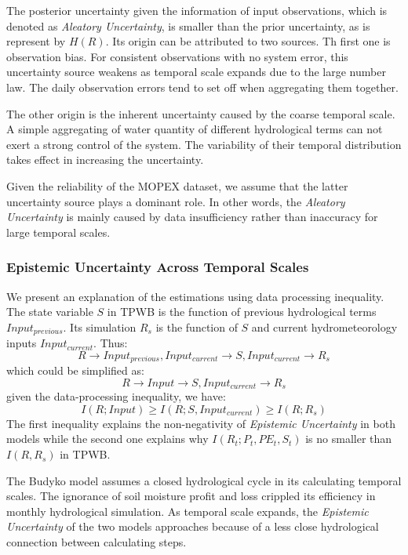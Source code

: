 \documentclass[draft,wrr]{AGUTeX}
\begin{document}
\begin{article}
The posterior uncertainty given the information of input observations, which is denoted as \emph{Aleatory Uncertainty}, is smaller than the prior uncertainty, as is represent by $H(R)$. Its origin can be attributed to two sources. Th first one is  observation bias. For consistent observations with no system error, this uncertainty source  weakens as temporal scale expands  due to the large number law. The daily observation errors tend to set off when aggregating them together. 

The other origin is the inherent uncertainty caused by the coarse temporal scale. A simple aggregating of water quantity of different hydrological terms can not exert a strong control of the system. The variability of their temporal distribution takes effect in increasing the uncertainty. 

Given the reliability of the MOPEX dataset, we assume that the latter uncertainty source plays a dominant role. In other words, the \emph{Aleatory Uncertainty} is mainly caused by data insufficiency rather than inaccuracy for large temporal scales. 
\subsubsection{Epistemic Uncertainty Across Temporal Scales}
We present an explanation of the estimations using data processing inequality. The state variable $S$ in TPWB is the function of previous hydrological terms $Input_{previous}$. Its simulation $R_s$ is the function of $S$ and current hydrometeorology inputs $Input_{current}$. Thus:
\begin{equation}
R \rightarrow Input_{previous},Input_{current} \rightarrow S,Input_{current} \rightarrow R_s
\end{equation}
which could be simplified  as:
 \begin{equation}
R \rightarrow Input \rightarrow S,Input_{current} \rightarrow R_s
\end{equation}
given the data-processing inequality, we have:
\begin{equation}
\label{ie2}
I(R;Input)\geq I(R;S,Input_{current}) \geq I(R;R_s)
\end{equation}
The first inequality explains the non-negativity of \emph{Epistemic Uncertainty} in both models while the second one explains why $I(R_t;P_t,PE_t,S_t)$ is no smaller than $I(R,R_s)$ in TPWB.

The Budyko model assumes a closed hydrological cycle in its calculating temporal scales. The ignorance of soil moisture profit and loss crippled its efficiency in monthly hydrological simulation. As temporal scale expands, the \emph{Epistemic Uncertainty} of the two models approaches because of a less close hydrological connection between calculating steps.
\fi

\end{article}
\end{document}

